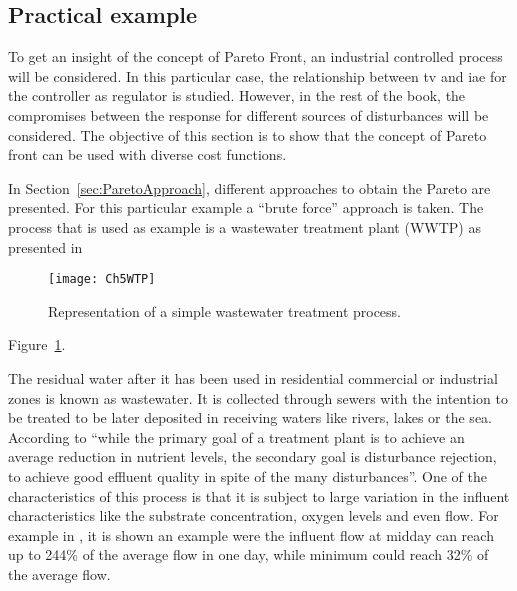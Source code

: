 \subsection{Practical example}
\label{sec:ParetoPractical}
To get an insight of the concept of Pareto Front, an industrial controlled process will be considered. In this particular case, the relationship between \gls{tv} and \gls{iae} for the controller as regulator is studied. However, in the rest of the book, the compromises between the response for different sources of disturbances will be considered. The objective of this section is to show that the concept of Pareto front can be used with diverse cost functions.

In Section~\ref{sec:ParetoApproach}, different approaches to obtain the Pareto are presented. For this particular example a ``brute force'' approach is taken. The process that is used as example is a wastewater treatment plant (WWTP) as presented in %
%
\begin{figure}[tb]
	\centering
	\texttt{[image: Ch5WTP]}
	\caption{Representation of a simple wastewater treatment process.}
	\label{sec:Ch5WTP}
\end{figure}
%
Figure~\ref{sec:Ch5WTP}.

The residual water after it has been used in residential commercial or industrial zones is known as wastewater. It is collected through sewers with the intention to be treated to be later deposited in receiving waters like rivers, lakes or the sea. According to \citet{Olsson1999} ``while the primary goal of a treatment plant is to achieve an average reduction in nutrient levels, the secondary goal is disturbance rejection, to achieve good effluent quality in spite of the many disturbances''. One of the characteristics of this process is that it is subject to large variation in the influent characteristics like the substrate concentration, oxygen levels and even flow. For example in \citet{Henze1997}, it is shown an example were the influent flow at midday can reach up to 244\% of the average flow in one day, while minimum could reach 32\% of the average flow.

